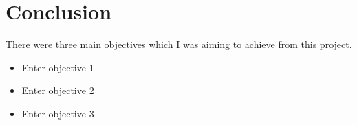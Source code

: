 \chapter{Conclusion}\label{conclusion}
There were three main objectives which I was aiming to achieve from this project.
\begin{itemize}
\item Enter objective 1
\item Enter objective 2
\item Enter objective 3
\end{itemize}
